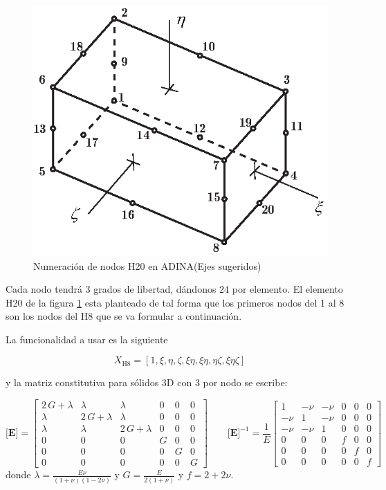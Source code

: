 \documentclass[11pt, a4paper,titlepage]{article}
\newcommand{\Adina}{{\sc ADINA}}
\newcommand{\Mme}[1]{\boldsymbol{[}\mathbf{#1} \boldsymbol{]}}
\newcommand{\ME}{\Mme{E}}
\begin{document}
\begin{figure}[htb!]
	\centering
	\includegraphics[width=.6\textwidth]{fig/H20numbering.eps}
	\caption{Numeración de nodos H20 en \Adina (Ejes sugeridos)}
	\label{fig:H20numbering}
\end{figure}

Cada nodo tendrá $3$ grados de libertad, dándonos $24$ \dof{} por elemento. El elemento H20 de la figura \ref{fig:H20numbering} esta planteado de tal forma que los primeros nodos del 1 al 8 son los nodos del H8 que se va formular a continuación.

La funcionalidad a usar es la siguiente

\[
X_{\mathrm{H8}} = \left[1, \xi, \eta, \zeta, \xi \eta, \xi \eta, \eta \zeta, \xi \eta \zeta \right]
\]


y la matriz constitutiva para sólidos 3D con 3 \dof{} por nodo se escribe:

\begin{equation}
	\ME =\left[\begin{array}{cccccc} 2\,G+\lambda  & \lambda  & \lambda  & 0 & 0 & 0\\ \lambda  & 2\,G+\lambda  & \lambda  & 0 & 0 & 0\\ \lambda  & \lambda  & 2\,G+\lambda  & 0 & 0 & 0\\ 0 & 0 & 0 & G & 0 & 0\\ 0 & 0 & 0 & 0 & G & 0\\ 0 & 0 & 0 & 0 & 0 & G \end{array}\right] \qquad \ME^{-1}=\frac{1}{E}\left[\begin{array}{cccccc} 1 & -\nu  & -\nu  & 0 & 0 & 0\\ -\nu  & 1 & -\nu  & 0 & 0 & 0\\ -\nu  & -\nu  & 1 & 0 & 0 & 0\\ 0 & 0 & 0 & f & 0 & 0\\ 0 & 0 & 0 & 0 & f & 0\\ 0 & 0 & 0 & 0 & 0 & f \end{array}\right]
\end{equation}
donde $\lambda = \frac{E \nu}{(1+\nu)(1-2\nu)}$ y $G=\frac{E}{2(1+\nu)}$ y $f = 2+2\nu$.
\end{document}
